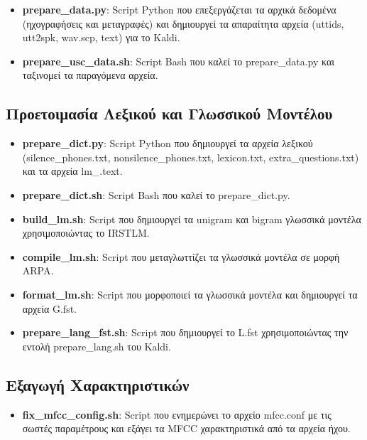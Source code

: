 \documentclass[a4paper,12pt]{article}
\begin{document}
\begin{itemize}
    \item \textbf{prepare\_data.py}: Script Python που επεξεργάζεται τα αρχικά δεδομένα (ηχογραφήσεις και μεταγραφές) και δημιουργεί τα απαραίτητα αρχεία (uttids, utt2spk, wav.scp, text) για το Kaldi.
    
    \item \textbf{prepare\_usc\_data.sh}: Script Bash που καλεί το prepare\_data.py και ταξινομεί τα παραγόμενα αρχεία.
\end{itemize}

\subsection{Προετοιμασία Λεξικού και Γλωσσικού Μοντέλου}

\begin{itemize}
    \item \textbf{prepare\_dict.py}: Script Python που δημιουργεί τα αρχεία λεξικού (silence\_phones.txt, nonsilence\_phones.txt, lexicon.txt, extra\_questions.txt) και τα αρχεία lm\_\*.text.
    
    \item \textbf{prepare\_dict.sh}: Script Bash που καλεί το prepare\_dict.py.
    
    \item \textbf{build\_lm.sh}: Script που δημιουργεί τα unigram και bigram γλωσσικά μοντέλα χρησιμοποιώντας το IRSTLM.
    
    \item \textbf{compile\_lm.sh}: Script που μεταγλωττίζει τα γλωσσικά μοντέλα σε μορφή ARPA.
    
    \item \textbf{format\_lm.sh}: Script που μορφοποιεί τα γλωσσικά μοντέλα και δημιουργεί τα αρχεία G.fst.
    
    \item \textbf{prepare\_lang\_fst.sh}: Script που δημιουργεί το L.fst χρησιμοποιώντας την εντολή prepare\_lang.sh του Kaldi.
\end{itemize}

\subsection{Εξαγωγή Χαρακτηριστικών}

\begin{itemize}
    \item \textbf{fix\_mfcc\_config.sh}: Script που ενημερώνει το αρχείο mfcc.conf με τις σωστές παραμέτρους και εξάγει τα MFCC χαρακτηριστικά από τα αρχεία ήχου.
\end{itemize}
\end{document}
